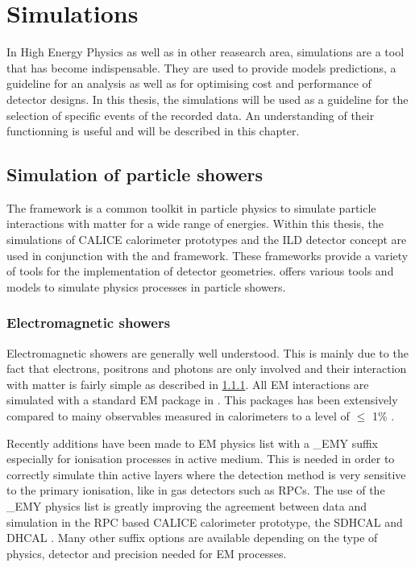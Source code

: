 \chapter{\geant Simulations}

In High Energy Physics as well as in other reasearch area, simulations are a tool that has become indispensable. They are used to provide models predictions, a guideline for an analysis as well as for optimising cost and performance of detector designs. In this thesis, the simulations will be used as a guideline for the selection of specific events of the recorded data. An understanding of their functionning is useful and will be described in this chapter.

\section{Simulation of particle showers}

The \geant framework \cite{Agostinelli2003} is a common toolkit in particle physics to simulate particle interactions with matter for a wide range of energies. Within this thesis, the simulations of CALICE calorimeter prototypes and the ILD detector concept are used in conjunction with the \mokka \cite{Freitas2003} and \ddhep \cite{Frank2014} framework. These frameworks provide a variety of tools for the implementation of detector geometries. \geant offers various tools and models to simulate physics processes in particle showers.

\subsection{Electromagnetic showers}

Electromagnetic showers are generally well understood. This is mainly due to the fact that electrons, positrons and photons are only involved and their interaction with matter is fairly simple as described in \ref{}. All EM interactions are simulated with a standard EM package in \geant \cite{Ivanchenko2010}. This packages has been extensively compared to mainy observables measured in calorimeters to a level of $\leq$ 1\% \cite{Apostolakis2015}.

Recently additions have been made to EM physics list with a \_{}EMY suffix especially for ionisation processes in active medium. This is needed in order to correctly simulate thin active layers where the detection method is very sensitive to the primary ionisation, like in gas detectors such as RPCs. The use of the \_{}EMY physics list is greatly improving the agreement between data and simulation in the RPC based CALICE calorimeter prototype, the SDHCAL and DHCAL \cite{Neubueser2016}. Many other suffix options are available depending on the type of physics, detector and precision needed for EM processes.

